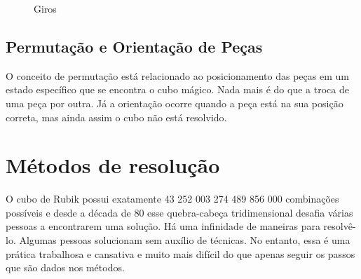 \begin{figure}[!htb]
    \centering
    \quad %
    \quad %
\caption{Giros}
\label{fig:figGiros}
\end{figure}


\subsection{Permutação e Orientação de Peças} 
O conceito de permutação está relacionado ao posicionamento das peças em um estado específico que se encontra o cubo mágico. Nada mais é do que a troca de uma peça por outra. Já a orientação ocorre quando a peça está na sua posição correta, mas ainda assim o cubo não está resolvido.






\section{Métodos de resolução}


O cubo de Rubik possui exatamente  43 252 003 274 489 856 000 combinações possíveis e desde a década de 80 esse quebra-cabeça tridimensional desafia várias pessoas a encontrarem uma solução. Há uma infinidade de maneiras para resolvê-lo. Algumas pessoas solucionam sem auxílio de técnicas. No entanto, essa é uma prática trabalhosa e cansativa e muito mais difícil do que apenas seguir os passos que são dados nos métodos.


